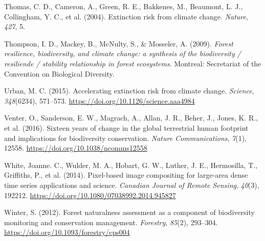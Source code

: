\documentclass[
]{agujournal2019}
\newlength{\cslhangindent}
\newenvironment{CSLReferences}[2] %
 {\begin{list}{}{%
  \setlength{\itemindent}{0pt}
  \setlength{\leftmargin}{0pt}
  \setlength{\parsep}{0pt}
  \ifodd #1
   \setlength{\leftmargin}{\cslhangindent}
   \setlength{\itemindent}{-1\cslhangindent}
  \fi
  \setlength{\itemsep}{#2\baselineskip}}}
 {\end{list}}
\begin{document}
\begin{CSLReferences}{1}{0}
Thomas, C. D., Cameron, A., Green, R. E., Bakkenes, M., Beaumont, L. J.,
Collingham, Y. C., et al. (2004). Extinction risk from climate change.
\emph{Nature}, \emph{427}, 5.

Thompson, I. D., Mackey, B., McNulty, S., \& Mosseler, A. (2009).
\emph{Forest resilience, biodiversity, and climate change: a synthesis
of the biodiversity / resiliende / stability relationship in forest
ecosystems}. Montreal: Secretariat of the Convention on Biological
Diversity.

Urban, M. C. (2015). Accelerating extinction risk from climate change.
\emph{Science}, \emph{348}(6234), 571--573.
\url{https://doi.org/10.1126/science.aaa4984}

Venter, O., Sanderson, E. W., Magrach, A., Allan, J. R., Beher, J.,
Jones, K. R., et al. (2016). Sixteen years of change in the global
terrestrial human footprint and implications for biodiversity
conservation. \emph{Nature Communications}, \emph{7}(1), 12558.
\url{https://doi.org/10.1038/ncomms12558}

White, Joanne. C., Wulder, M. A., Hobart, G. W., Luther, J. E.,
Hermosilla, T., Griffiths, P., et al. (2014). Pixel-based image
compositing for large-area dense time series applications and science.
\emph{Canadian Journal of Remote Sensing}, \emph{40}(3), 192212.
\url{https://doi.org/10.1080/07038992.2014.945827}

Winter, S. (2012). Forest naturalness assessment as a component of
biodiversity monitoring and conservation management. \emph{Forestry},
\emph{85}(2), 293--304. \url{https://doi.org/10.1093/forestry/cps004}

\end{CSLReferences}
\end{document}
